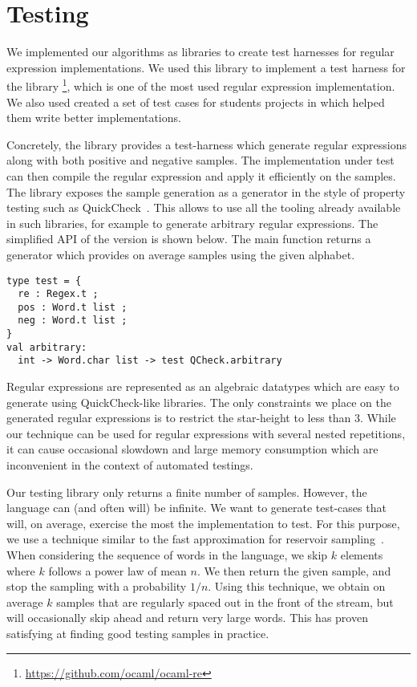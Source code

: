\section{Testing}
\label{sec:test}

We implemented our algorithms as libraries to create
test harnesses for regular expression implementations.
We used this library to implement a test harness for the \ocaml {} library
\footnote{\url{https://github.com/ocaml/ocaml-re}},
which is one of the most used \ocaml regular expression implementation.
%
We also used created a set of test cases for students projects in \haskell
which helped them write better implementations.

Concretely, the library provides a test-harness which generate
regular expressions along with both positive and negative samples. The
implementation under test can then compile the regular expression and apply it
efficiently on the samples.
The library exposes the sample generation as a generator in the style of
property testing such as QuickCheck~\cite{DBLP:conf/icfp/ClaessenH00}.
This allows to use all the tooling already available in such libraries, for
example to generate arbitrary regular expressions.
%
The simplified API of the \ocaml version is shown below.
The main function  returns a generator
which provides on average  samples using the given alphabet.

\begin{lstlisting}
type test = {
  re : Regex.t ;
  pos : Word.t list ;
  neg : Word.t list ;
}
val arbitrary:
  int -> Word.char list -> test QCheck.arbitrary
\end{lstlisting}

Regular expressions are represented as an algebraic datatypes which
are easy to generate using QuickCheck-like libraries.
The only constraints we place on the generated regular expressions
is to restrict the star-height to less than 3. While our technique can be used
for regular expressions with several nested repetitions, it can cause
occasional slowdown and large memory consumption which are inconvenient
in the context of automated testings.

Our testing library only returns a finite number of samples. However, the
language can (and often will) be infinite. We want to generate test-cases that will,
on average, exercise the most the implementation to test. For this purpose, we
use a technique similar to the fast approximation
for reservoir sampling~\citep{DBLP:journals/toms/Vitter87}.
When considering
the sequence of words in the language, we skip $k$ elements where
$k$ follows a power law of mean $n$. We then return the given
sample, and stop the sampling with a probability $1/n$.
%
Using this technique, we obtain on average $k$ samples that are regularly
spaced out in the front of the stream, but will occasionally skip ahead
and return very large words. This has proven satisfying at finding good
testing samples in practice.

